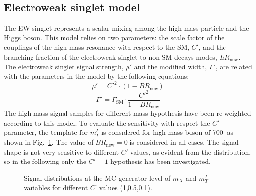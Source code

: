 \subsection*{Electroweak singlet model}
The EW singlet represents a scalar mixing among the high mass particle and the Higgs boson. This model relies on two parameters: the scale factor of the couplings of the high mass resonance with respect to the SM, $C'$, and the branching fraction of the electroweak singlet to non-SM decays modes, $BR_\mathrm{new}$. The electroweak singlet signal strength, $\mu'$ and the modified width, $\Gamma'$, are related with the parameters in the model by the following equations:
\newline
\begin{equation}
\mu' = C'^2 \cdot (1 - BR_\mathrm{new})
\end{equation}
\begin{equation}
\Gamma' = \Gamma_\mathrm{SM} \cdot \frac{C'^2}{1 - BR_\mathrm{new}}
\end{equation}
\newline
The high mass signal samples for different mass hypothesis have been re-weighted according to this model.
To evaluate the sensitivity with respect the $C'$ parameter, the template for $m_T^I$ is 
considered for high mass boson of 700\GeV, as shown in Fig.~\ref{fig:cprime}.  The value of $BR_\mathrm{new} = 0$ is considered in all cases. 
The signal shape is not very sensitive to different $C'$ values, as evident from the distribution, so in the following only the $C'=1$ 
hypothesis has been investigated.
\begin{figure}[htbp]
\centering
{}
\caption{ Signal distributions at the MC generator level of $m_X$ and $m_T^I$ variables for different $C'$ values (1,0.5,0.1).}
    \label{fig:cprime}
\end{figure}

